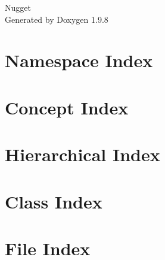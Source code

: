 \documentclass[twoside]{book}
\newcommand{\+}{\discretionary{\mbox{\scriptsize$\hookleftarrow$}}{}{}}
\newcommand{\clearemptydoublepage}{%
    \newpage{\pagestyle{empty}\cleardoublepage}%
  }
\begin{document}
  \raggedbottom
    \hypersetup{pageanchor=false,
                bookmarksnumbered=true,
                pdfencoding=unicode
               }
  \begin{titlepage}
  \vspace*{7cm}
  \begin{center}%
  {\Large Nugget}\\
  \vspace*{1cm}
  {\large Generated by Doxygen 1.9.8}\\
  \end{center}
  \end{titlepage}
  \clearemptydoublepage
  \tableofcontents
  \clearemptydoublepage
  \hypersetup{pageanchor=true}













\chapter{Namespace Index}

\chapter{Concept Index}

\chapter{Hierarchical Index}

\chapter{Class Index}

\chapter{File Index}

\end{document}
